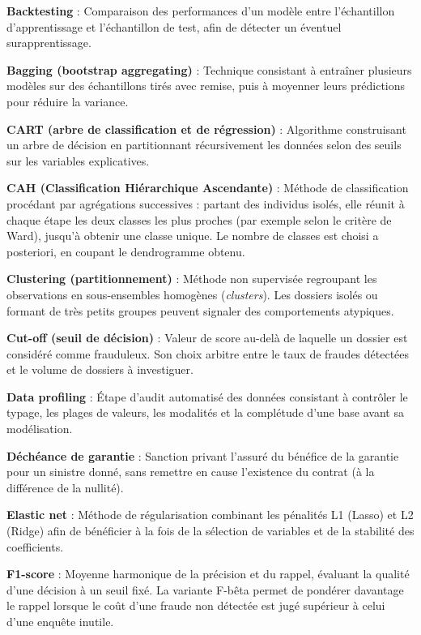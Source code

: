 \textbf{Backtesting} : Comparaison des performances d'un modèle entre l'échantillon d'apprentissage et l'échantillon de test, afin de détecter un éventuel surapprentissage.

\textbf{Bagging (bootstrap aggregating)} : Technique consistant à entraîner plusieurs modèles sur des échantillons tirés avec remise, puis à moyenner leurs prédictions pour réduire la variance.

\textbf{CART (arbre de classification et de régression)} : Algorithme construisant un arbre de décision en partitionnant récursivement les données selon des seuils sur les variables explicatives.

\textbf{CAH (Classification Hiérarchique Ascendante)} : Méthode de classification procédant par agrégations successives : partant des individus isolés, elle réunit à chaque étape les deux classes les plus proches (par exemple selon le critère de Ward), jusqu'à obtenir une classe unique. Le nombre de classes est choisi a posteriori, en coupant le dendrogramme obtenu.

\textbf{Clustering (partitionnement)} : Méthode non supervisée regroupant les observations en sous-ensembles homogènes (\textit{clusters}). Les dossiers isolés ou formant de très petits groupes peuvent signaler des comportements atypiques.

\textbf{Cut-off (seuil de décision)} : Valeur de score au-delà de laquelle un dossier est considéré comme frauduleux. Son choix arbitre entre le taux de fraudes détectées et le volume de dossiers à investiguer.

\textbf{Data profiling} : Étape d'audit automatisé des données consistant à contrôler le typage, les plages de valeurs, les modalités et la complétude d'une base avant sa modélisation.

\textbf{Déchéance de garantie} : Sanction privant l'assuré du bénéfice de la garantie pour un sinistre donné, sans remettre en cause l'existence du contrat (à la différence de la nullité).

\textbf{Elastic net} : Méthode de régularisation combinant les pénalités L1 (Lasso) et L2 (Ridge) afin de bénéficier à la fois de la sélection de variables et de la stabilité des coefficients.

\textbf{F1-score} : Moyenne harmonique de la précision et du rappel, évaluant la qualité d'une décision à un seuil fixé. La variante F-bêta permet de pondérer davantage le rappel lorsque le coût d'une fraude non détectée est jugé supérieur à celui d'une enquête inutile.

